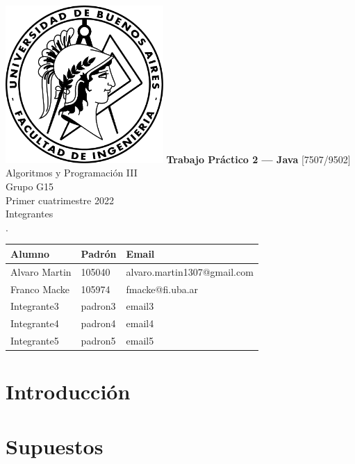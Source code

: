 \documentclass[titlepage,a4paper]{article}
\begin{document}
\begin{titlepage} %
	\hfill\includegraphics[width=6cm]{logofiuba.jpg}
    \centering
    \vfill
    \Huge \textbf{Trabajo Práctico 2 — Java}
    \vskip2cm
    \Large [7507/9502] Algoritmos y Programación III\\
    Grupo G15 \\
    Primer cuatrimestre 2022 \\
    \vfill
    Integrantes \\
    .\\
    \begin{tabular}{ | l | l | l | } %
      \hline
      Alumno & Padrón & Email \\ \hline
      Alvaro Martin & 105040 & alvaro.martin1307@gmail.com \\ \hline
      Franco Macke & 105974 & fmacke@fi.uba.ar \\ \hline
      Integrante3 & padron3 & email3 \\ \hline
      Integrante4 & padron4 & email4 \\ \hline
      Integrante5 & padron5 & email5 \\ \hline
  	\end{tabular}
    \vfill
    \vfill
\end{titlepage}

\tableofcontents %
\newpage

\section{Introducción}\label{sec:intro}

\section{Supuestos}\label{sec:supuestos}
\end{document}
